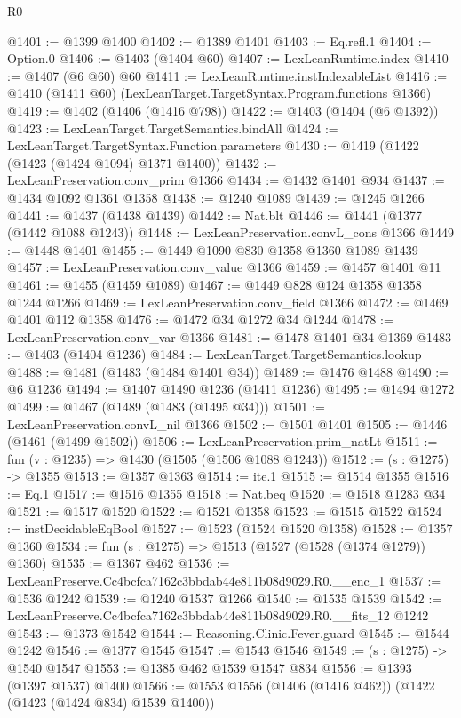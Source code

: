 \begin{lexlean}{R0}
\begin{coremodule}
@1401 := @1399 @1400
@1402 := @1389 @1401
@1403 := Eq.refl.{1}
@1404 := Option.{0}
@1406 := @1403 (@1404 @60)
@1407 := LexLeanRuntime.index
@1410 := @1407 (@6 @60) @60
@1411 := LexLeanRuntime.instIndexableList
@1416 := @1410 (@1411 @60) (LexLeanTarget.TargetSyntax.Program.functions @1366)
@1419 := @1402 (@1406 (@1416 @798))
@1422 := @1403 (@1404 (@6 @1392))
@1423 := LexLeanTarget.TargetSemantics.bindAll
@1424 := LexLeanTarget.TargetSyntax.Function.parameters
@1430 := @1419 (@1422 (@1423 (@1424 @1094) @1371 @1400))
@1432 := LexLeanPreservation.conv_prim @1366
@1434 := @1432 @1401 @934
@1437 := @1434 @1092 @1361 @1358
@1438 := @1240 @1089
@1439 := @1245 @1266
@1441 := @1437 (@1438 @1439)
@1442 := Nat.blt
@1446 := @1441 (@1377 (@1442 @1088 @1243))
@1448 := LexLeanPreservation.convL_cons @1366
@1449 := @1448 @1401
@1455 := @1449 @1090 @830 @1358 @1360 @1089 @1439
@1457 := LexLeanPreservation.conv_value @1366
@1459 := @1457 @1401 @11
@1461 := @1455 (@1459 @1089)
@1467 := @1449 @828 @124 @1358 @1358 @1244 @1266
@1469 := LexLeanPreservation.conv_field @1366
@1472 := @1469 @1401 @112 @1358
@1476 := @1472 @34 @1272 @34 @1244
@1478 := LexLeanPreservation.conv_var @1366
@1481 := @1478 @1401 @34 @1369
@1483 := @1403 (@1404 @1236)
@1484 := LexLeanTarget.TargetSemantics.lookup
@1488 := @1481 (@1483 (@1484 @1401 @34))
@1489 := @1476 @1488
@1490 := @6 @1236
@1494 := @1407 @1490 @1236 (@1411 @1236)
@1495 := @1494 @1272
@1499 := @1467 (@1489 (@1483 (@1495 @34)))
@1501 := LexLeanPreservation.convL_nil @1366
@1502 := @1501 @1401
@1505 := @1446 (@1461 (@1499 @1502))
@1506 := LexLeanPreservation.prim_natLt
@1511 := fun (v : @1235) => @1430 (@1505 (@1506 @1088 @1243))
@1512 := (s : @1275) -> @1355
@1513 := @1357 @1363
@1514 := ite.{1}
@1515 := @1514 @1355
@1516 := Eq.{1}
@1517 := @1516 @1355
@1518 := Nat.beq
@1520 := @1518 @1283 @34
@1521 := @1517 @1520
@1522 := @1521 @1358
@1523 := @1515 @1522
@1524 := instDecidableEqBool
@1527 := @1523 (@1524 @1520 @1358)
@1528 := @1357 @1360
@1534 := fun (s : @1275) => @1513 (@1527 (@1528 (@1374 @1279)) @1360)
@1535 := @1367 @462
@1536 := LexLeanPreserve.Cc4bcfca7162c3bbdab44e811b08d9029.R0.__enc_1
@1537 := @1536 @1242
@1539 := @1240 @1537 @1266
@1540 := @1535 @1539
@1542 := LexLeanPreserve.Cc4bcfca7162c3bbdab44e811b08d9029.R0.__fits_12 @1242
@1543 := @1373 @1542
@1544 := Reasoning.Clinic.Fever.guard
@1545 := @1544 @1242
@1546 := @1377 @1545
@1547 := @1543 @1546
@1549 := (s : @1275) -> @1540 @1547
@1553 := @1385 @462 @1539 @1547 @834
@1556 := @1393 (@1397 @1537) @1400
@1566 := @1553 @1556 (@1406 (@1416 @462)) (@1422 (@1423 (@1424 @834) @1539 @1400))

\end{coremodule}
\end{lexlean}
